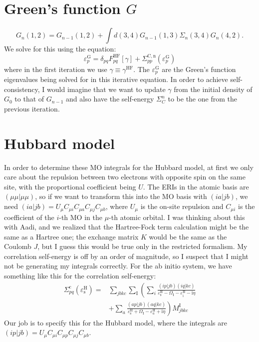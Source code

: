 \documentclass[12pt]{article}
\begin{document}
\section{Green's function $G$}
\begin{equation}
    G_n(1,2)=G_{n-1}(1,2)+\int d(3,4) G_{n-1}(1,3) \Sigma_n(3,4) G_n(4,2).
\end{equation}
We solve for this using the equation:
\begin{equation}
    \varepsilon_{p}^{\mathrm{G}} = \delta_{pq}F_{pq}^{\mathrm{HF}}[\gamma] + \Sigma_{pp}^{\mathrm{C,n}}(\varepsilon_{p}^{\mathrm{G}})
\label{eq: Iterative equation}
\end{equation}
where in the first iteration we use $\gamma \equiv \gamma^{\mathrm{HF}}$. The $\varepsilon_{p}^{\mathrm{G}}$ are the Green's function eigenvalues being solved for in this iterative equation. In order to achieve self-consistency, I would imagine that we want to update $\gamma$ from the initial density of $G_0$ to that of $G_{n-1}$ and also have the self-energy $\Sigma_C^n$ to be the one from the previous iteration.
\section{Hubbard model}
In order to determine these MO integrals for the Hubbard model, at first we only care about the repulsion between two electrons with opposite spin on the same site, with the proportional coefficient being \( U \). The ERIs in the atomic basis are \( (\mu\mu|\mu\mu) \), so if we want to transform this into the MO basis with \( (ia|jb) \), we need \( (ia|jb) = U_{\mu} C_{\mu i} C_{\mu a} C_{\mu j} C_{\mu b} \), where \( U_{\mu} \) is the on-site repulsion and \( C_{\mu i} \) is the coefficient of the \( i \)-th MO in the \( \mu \)-th atomic orbital. I was thinking about this with Aadi, and we realized that the Hartree-Fock term calculation might be the same as a Hartree one; the exchange matrix \( K \) would be the same as the Coulomb \( J \), but I guess this would be true only in the restricted formalism. My correlation self-energy is off by an order of magnitude, so I suspect that I might not be generating my integrals correctly. For the ab initio system, we have something like this for the correlation self-energy:
\begin{equation}
\begin{aligned}
\Sigma_{pq}^{\mathrm{c}}\left(\varepsilon_{\mathrm{s}}^{\mathrm{H}}\right)= & \sum_{jbkc} \sum_{\mathrm{I}}\left(\sum_i \frac{(ip | jb)(iq | kc)}{\varepsilon_{\mathrm{s}}^{\mathrm{H}}-\Omega_{\mathrm{I}}-\varepsilon_{\mathrm{i}}^{\mathrm{H}}-\mathrm{i} \eta}\right. \\
& \left.+\sum_a \frac{(ap | jb)(aq | kc)}{\varepsilon_{\mathrm{s}}^{\mathrm{H}}+\Omega_{\mathrm{I}}-\varepsilon_a^{\mathrm{H}}+\mathrm{i} \eta}\right) M_{jbkc}^{\mathrm{I}}
\end{aligned}
\end{equation}
Our job is to specify this for the Hubbard model, where the integrals are \( (ip | jb) = U_{\mu} C_{\mu i} C_{\mu p} C_{\mu j} C_{\mu b} \).
\end{document}
